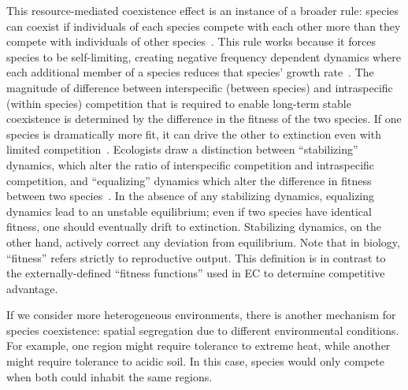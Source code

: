 This resource-mediated coexistence effect is an instance of a broader rule: species can coexist if individuals of each species compete with each other more than they compete with individuals of other species~\cite{chesson_mechanisms_2000}. This rule works because it forces species to be self-limiting, creating negative frequency dependent dynamics where each additional member of a species reduces that species' growth rate~\cite{adler_niche_2007}. The magnitude of difference between interspecific (between species) and intraspecific (within species) competition that is required to enable long-term stable coexistence is determined by the difference in the fitness of the two species. If one species is dramatically more fit, it can drive the other to extinction even with limited competition~\cite{chesson_mechanisms_2000}. Ecologists draw a distinction between ``stabilizing'' dynamics, which alter the ratio of interspecific competition and intraspecific competition, and ``equalizing'' dynamics which alter the difference in fitness between two species~\cite{adler_niche_2007}. In the absence of any stabilizing dynamics, equalizing dynamics lead to an unstable equilibrium; even if two species have identical fitness, one should eventually drift to extinction. Stabilizing dynamics, on the other hand, actively correct any deviation from equilibrium.
Note that in biology, ``fitness'' refers strictly to reproductive output. This definition is in contrast to the externally-defined ``fitness functions'' used in EC to determine competitive advantage.

If we consider more heterogeneous environments, there is another mechanism for species coexistence: spatial segregation due to different environmental conditions. For example, one region might require tolerance to extreme heat, while another might require tolerance to acidic soil. In this case, species would only compete when both could inhabit the same regions.

